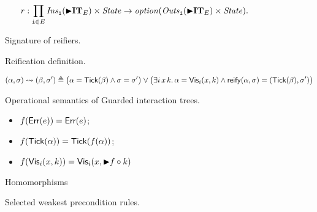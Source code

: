 \begin{figure}
  \[
    r : \prod_{{\mathtt i} \in E} \mathit{Ins}_{{\mathtt i}}(\mathord{\blacktriangleright} \mathbf{IT}_E) \times \mathit{State} \to \mathit{option}(\mathit{Outs}_{{\mathtt i}}(\mathord{\blacktriangleright}\mathbf{IT}_E) \times \mathit{State}).
  \]
  \caption{Signature of reifiers.}
  \label{fig:reifier_sig}
\end{figure}

\begin{figure}
  \caption{Reification definition.}
  \label{fig:reify_def}
\end{figure}

\begin{figure}
  \[
    (\alpha,\sigma) \istep (\beta,\sigma') \eqdef
    \big(\alpha = \Tick(\beta) \wedge \sigma = \sigma' \big)
    \vee \big(\Exists i\,x\,k. \alpha = \Vis_i(x,k)
    \wedge \reify(\alpha,\sigma) = (\Tick(\beta),\sigma')\big)
  \]
  \caption{Operational semantics of Guarded interaction trees.}
  \label{fig:opsem_gitrees}
\end{figure}

\begin{figure}
  \begin{itemize}
  \item $f(\mathsf{Err}(e)) = \mathsf{Err}(e)$;
  \item $f(\mathsf{Tick}(\alpha)) = \mathsf{Tick}(f(\alpha))$;
  \item $f(\mathsf{Vis}_i(x,k)) = \mathsf{Vis}_i(x, \mathord{\blacktriangleright} f \circ k)$
  \end{itemize}
  \caption{Homomorphisms}
  \label{fig:hom}
\end{figure}

\begin{figure}
  \caption{Selected weakest precondition rules.}
  \label{fig:wp_rules}
\end{figure}

